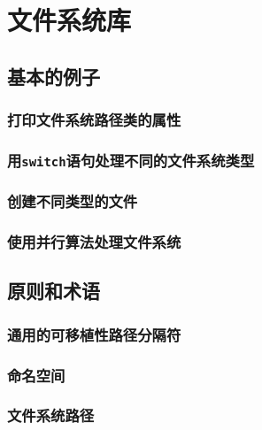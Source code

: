 \section{文件系统库}\label{ch20}

\subsection{基本的例子}

\subsubsection{打印文件系统路径类的属性}

\subsubsection{用\texttt{switch}语句处理不同的文件系统类型}

\subsubsection{创建不同类型的文件}

\subsubsection{使用并行算法处理文件系统}

\subsection{原则和术语}

\subsubsection{通用的可移植性路径分隔符}

\subsubsection{命名空间}

\subsubsection{文件系统路径}\label{ch20.2.3}